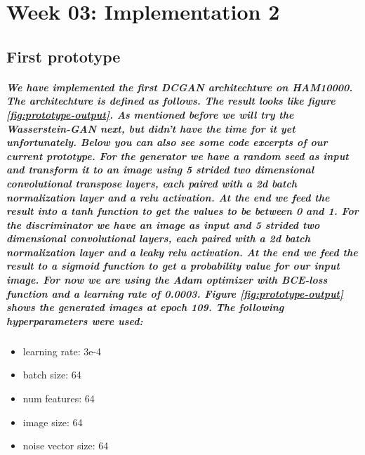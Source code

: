 \newpage
\chapter{Week 03: Implementation 2}
\section{First prototype}
\paragraph{
 We have implemented the first DCGAN architechture on HAM10000. The architechture is defined as follows. The result looks like figure \ref{fig:prototype-output}. As mentioned before we will try the Wasserstein-GAN next, but didn't have the time for it yet unfortunately. Below you can also see some code excerpts of our current prototype.
 For the generator we have a random seed as input and transform it to an image using 5 strided two dimensional convolutional transpose layers, each paired with a 2d batch normalization layer and a relu activation. At the end we feed the result into a tanh function to get the values to be between 0 and 1. 
 For the discriminator we have an image as input and 5 strided two dimensional convolutional layers, each paired with a 2d batch normalization layer and a leaky relu activation. At the end we feed the result to a sigmoid function to get a probability value for our input image.
 For now we are using the Adam optimizer with BCE-loss function and a learning rate of 0.0003.
 Figure \ref{fig:prototype-output} shows the generated images at \textbf{epoch 109}. The following hyperparameters were used:
}

\begin{itemize}
    \item learning rate: 3e-4
    \item batch size: 64
    \item num features: 64
    \item image size: 64
    \item noise vector size: 64
\end{itemize}


